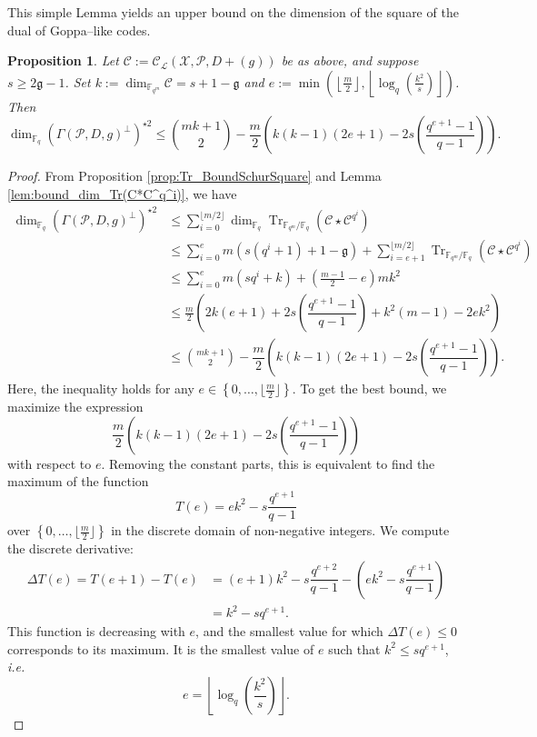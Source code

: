 \documentclass[a4paper]{article}
\newtheorem{proposition}[thm]{Proposition}
\theoremstyle{definition}
\theoremstyle{remark}
\newcommand{\calP}{\mathcal{P}}
\newcommand{\calL}{\mathcal{L}}
\newcommand{\calC}{\mathcal{C}}
\newcommand{\calX}{\mathcal{X}}
\newcommand{\fqm}{\mathbb{F}_{q^m}}
\newcommand{\fq}{\mathbb{F}_{q}}
\newcommand{\Tr}[1]{\operatorname{Tr}_{\mathbb{F}_{q^m}/\fq}\left(#1\right)}
\newcommand{\set}[1]{\left\{#1\right\}}
\begin{document}
\noindent This simple Lemma yields an upper bound on the dimension of the square of the dual of Goppa--like codes.

\begin{proposition} \label{prop:bound_dim_using_inclusions}
    Let $\calC := \calC_{\calL}(\calX,\calP,D+(g))$ be as above, and suppose $s \geq 2\mathfrak{g}-1$. Set $k := \dim_{\fqm}\calC = s+1-\mathfrak{g}$ and  $e := \min\left(\left\lfloor \frac{m}{2} \right\rfloor,\left\lfloor \log_q\left(\frac{k^2}{s}\right)\right\rfloor\right)$. Then
    $$\dim_{\fq} (\Gamma(\calP,D,g)^{\perp})^{\star 2} \leq \binom{mk+1}{2} - \dfrac{m}{2}\left(k(k-1)(2e+1)-2s\left(\dfrac{q^{e+1}-1}{q-1}\right)\right).$$
\end{proposition}

\begin{proof}
    From Proposition \ref{prop:Tr_BoundSchurSquare} and Lemma \ref{lem:bound_dim_Tr(C*C^q^i)}, we have 
    \begin{align*}
        \dim_{\fq}(\Gamma(\calP,D,g)^{\perp})^{\star 2}
        & \leq \sum\limits_{i=0}^{\lfloor m/2 \rfloor} \dim_{\fq} \Tr{\calC \star \calC^{q^i}} \\
        & \leq \sum\limits_{i=0}^{e} m(s(q^i+1)+1-\mathfrak{g})  + \sum\limits_{i=e+1}^{\lfloor m/2 \rfloor} \Tr{\calC \star \calC^{q^i}} \\
        & \leq \sum\limits_{i=0}^{e} m(sq^i+k) + \left( \frac{m-1}{2} -e \right)mk^2 \\
        & \leq \frac{m}{2}\left(2k(e+1)+2s\left(\dfrac{q^{e+1}-1}{q-1}\right)+k^2(m-1)-2ek^2  \right) \\
        & \leq \binom{mk+1}{2} -  \dfrac{m}{2}\left(k(k-1)(2e+1)-2s\left(\dfrac{q^{e+1}-1}{q-1}\right)\right).
    \end{align*}
Here, the inequality holds for any $e \in \set{0,\dots,\lfloor \frac{m}{2} \rfloor}$. To get the best bound, we maximize the expression $$ \dfrac{m}{2}\left(k(k-1)(2e+1)-2s\left(\dfrac{q^{e+1}-1}{q-1}\right)\right)$$ with respect to $e$. Removing the constant parts, this is equivalent to find the maximum of the function
$$T(e) = ek^2-s\dfrac{q^{e+1}}{q-1}$$
over $\set{0,\dots,\lfloor \frac{m}{2} \rfloor}$ in the discrete domain of non-negative integers.  
We compute the discrete derivative:
\begin{align*}
    \Delta T(e) = T(e+1)-T(e) &= (e+1)k^2-s\dfrac{q^{e+2}}{q-1} - \left(ek^2-s\dfrac{q^{e+1}}{q-1}\right) \\
                              &= k^2 - sq^{e+1}.
\end{align*}
This function is decreasing with $e$, and the smallest value for which $\Delta T(e) \leq 0$ corresponds to its maximum. It is the smallest value of $e$ such that $k^2 \leq sq^{e+1}$, \emph{i.e.}
$$e =  \left\lfloor \log_q\left(\dfrac{k^2}{s}\right)\right\rfloor.$$
\end{proof}
\end{document}
